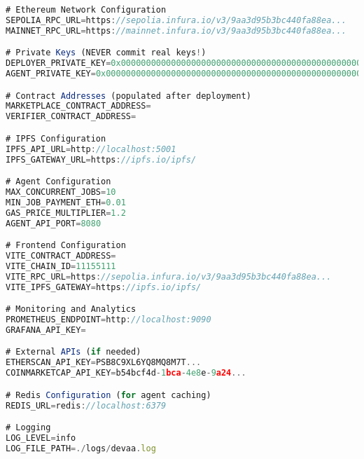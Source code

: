 \begin{lstlisting}[language=JavaScript,caption={.env.example - Environment variables template}]
# Ethereum Network Configuration
SEPOLIA_RPC_URL=https://sepolia.infura.io/v3/9aa3d95b3bc440fa88ea...
MAINNET_RPC_URL=https://mainnet.infura.io/v3/9aa3d95b3bc440fa88ea...

# Private Keys (NEVER commit real keys!)
DEPLOYER_PRIVATE_KEY=0x0000000000000000000000000000000000000000000000000000000000000000
AGENT_PRIVATE_KEY=0x0000000000000000000000000000000000000000000000000000000000000000

# Contract Addresses (populated after deployment)
MARKETPLACE_CONTRACT_ADDRESS=
VERIFIER_CONTRACT_ADDRESS=

# IPFS Configuration
IPFS_API_URL=http://localhost:5001
IPFS_GATEWAY_URL=https://ipfs.io/ipfs/

# Agent Configuration
MAX_CONCURRENT_JOBS=10
MIN_JOB_PAYMENT_ETH=0.01
GAS_PRICE_MULTIPLIER=1.2
AGENT_API_PORT=8080

# Frontend Configuration
VITE_CONTRACT_ADDRESS=
VITE_CHAIN_ID=11155111
VITE_RPC_URL=https://sepolia.infura.io/v3/9aa3d95b3bc440fa88ea...
VITE_IPFS_GATEWAY=https://ipfs.io/ipfs/

# Monitoring and Analytics
PROMETHEUS_ENDPOINT=http://localhost:9090
GRAFANA_API_KEY=

# External APIs (if needed)
ETHERSCAN_API_KEY=PSB8C9XL6YQ8MQ8M7T...
COINMARKETCAP_API_KEY=b54bcf4d-1bca-4e8e-9a24...

# Redis Configuration (for agent caching)
REDIS_URL=redis://localhost:6379

# Logging
LOG_LEVEL=info
LOG_FILE_PATH=./logs/devaa.log
\end{lstlisting}

